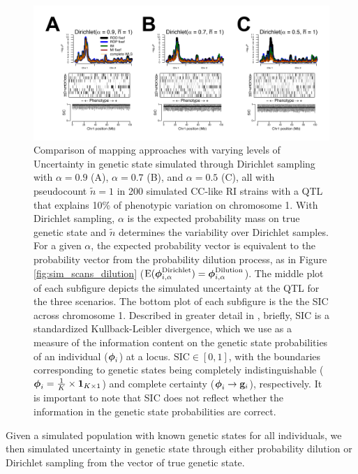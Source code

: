 \begin{figure}
\renewcommand{\familydefault}{\sfdefault}\normalfont
\centering
\includegraphics[width=\textwidth]{figures/4-mi/fixef_mapping_uncertainty_dirichlet.pdf}
\caption[Effect of uncertainty modeled through Dirichlet sampling on genome scan in a single simulated CC-like RI panel]{Comparison of mapping approaches with varying levels of Uncertainty in genetic state simulated through Dirichlet sampling with $\alpha = 0.9$ (A), $\alpha = 0.7$ (B), and $\alpha = 0.5$ (C), all with pseudocount $\tilde{n} = 1$ in 200 simulated CC-like RI strains with a QTL that explains 10\% of phenotypic variation on chromosome 1. With Dirichlet sampling, $\alpha$ is the expected probability mass on true genetic state and $\tilde{n}$ determines the variability over Dirichlet samples. For a given $\alpha$, the expected probability vector is equivalent to the probability vector from the probability dilution process, as in Figure \ref{fig:sim_scans_dilution} ($\text{E}(\boldsymbol{\phi}^{\text{Dirichlet}}_{i, \alpha}) = \boldsymbol{\phi}^{\text{Dilution}}_{i, \alpha}$). The middle plot of each subfigure depicts the simulated uncertainty at the QTL for the three scenarios. The bottom plot of each subfigure is the the SIC across chromosome 1. Described in greater detail in \cite{Ronnegard2011}, briefly, SIC is a standardized Kullback-Leibler divergence, which we use as a measure of the information content on the genetic state probabilities of an individual ($\boldsymbol{\phi}_{i}$) at a locus. $\text{SIC} \in [0, 1]$, with the boundaries corresponding to genetic states being completely indistinguishable ($\boldsymbol{\phi}_{i} = \frac{1}{K} \times \mathbf{1}_{K \times 1}$) and complete certainty ($\boldsymbol{\phi}_{i} \rightarrow \mathbf{g}_{i}$), respectively. It is important to note that SIC does not reflect whether the information in the genetic state probabilities are correct. \label{fig:sim_scans_dirichlet}}
\end{figure}

Given a simulated population with known genetic states for all individuals, we then simulated uncertainty in genetic state through either probability dilution or Dirichlet sampling from the vector of true genetic state. 

